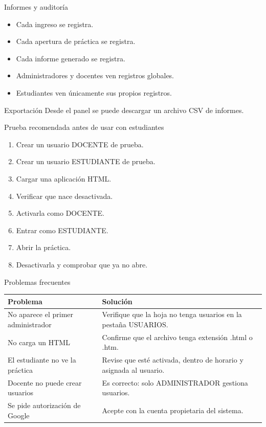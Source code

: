 \documentclass[aspectratio=169,11pt]{beamer}
\begin{document}
\begin{frame}{Informes y auditoría}
\begin{itemize}
  \item Cada ingreso se registra.
  \item Cada apertura de práctica se registra.
  \item Cada informe generado se registra.
  \item Administradores y docentes ven registros globales.
  \item Estudiantes ven únicamente sus propios registros.
\end{itemize}
\begin{block}{Exportación}
Desde el panel se puede descargar un archivo CSV de informes.
\end{block}
\end{frame}

\begin{frame}{Prueba recomendada antes de usar con estudiantes}
\begin{enumerate}
  \item Crear un usuario DOCENTE de prueba.
  \item Crear un usuario ESTUDIANTE de prueba.
  \item Cargar una aplicación HTML.
  \item Verificar que nace desactivada.
  \item Activarla como DOCENTE.
  \item Entrar como ESTUDIANTE.
  \item Abrir la práctica.
  \item Desactivarla y comprobar que ya no abre.
\end{enumerate}
\end{frame}

\begin{frame}{Problemas frecuentes}
\begin{tabular}{p{4.3cm}p{8.3cm}}
\toprule
\textbf{Problema} & \textbf{Solución}\\
\midrule
No aparece el primer administrador & Verifique que la hoja no tenga usuarios en la pestaña USUARIOS.\\
No carga un HTML & Confirme que el archivo tenga extensión .html o .htm.\\
El estudiante no ve la práctica & Revise que esté activada, dentro de horario y asignada al usuario.\\
Docente no puede crear usuarios & Es correcto: solo ADMINISTRADOR gestiona usuarios.\\
Se pide autorización de Google & Acepte con la cuenta propietaria del sistema.\\
\bottomrule
\end{tabular}
\end{frame}
\end{document}
